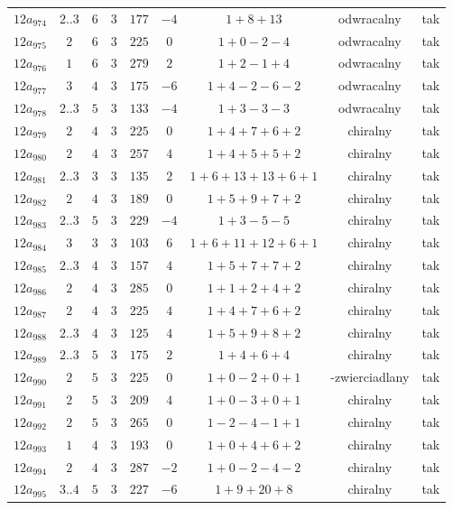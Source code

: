 \begin{longtable}{ccccccccc}
$12a_{974}$ & $2..3$ & $6$ & $3$ & $177$ & $-4$ & $1+8+13$ & odwracalny & tak \\
$12a_{975}$ & $2$ & $6$ & $3$ & $225$ & $0$ & $1+0-2-4$ & odwracalny & tak \\
$12a_{976}$ & $1$ & $6$ & $3$ & $279$ & $2$ & $1+2-1+4$ & odwracalny & tak \\
$12a_{977}$ & $3$ & $4$ & $3$ & $175$ & $-6$ & $1+4-2-6-2$ & odwracalny & tak \\
$12a_{978}$ & $2..3$ & $5$ & $3$ & $133$ & $-4$ & $1+3-3-3$ & odwracalny & tak \\
$12a_{979}$ & $2$ & $4$ & $3$ & $225$ & $0$ & $1+4+7+6+2$ & chiralny & tak \\
$12a_{980}$ & $2$ & $4$ & $3$ & $257$ & $4$ & $1+4+5+5+2$ & chiralny & tak \\
$12a_{981}$ & $2..3$ & $3$ & $3$ & $135$ & $2$ & $1+6+13+13+6+1$ & chiralny & tak \\
$12a_{982}$ & $2$ & $4$ & $3$ & $189$ & $0$ & $1+5+9+7+2$ & chiralny & tak \\
$12a_{983}$ & $2..3$ & $5$ & $3$ & $229$ & $-4$ & $1+3-5-5$ & chiralny & tak \\
$12a_{984}$ & $3$ & $3$ & $3$ & $103$ & $6$ & $1+6+11+12+6+1$ & chiralny & tak \\
$12a_{985}$ & $2..3$ & $4$ & $3$ & $157$ & $4$ & $1+5+7+7+2$ & chiralny & tak \\
$12a_{986}$ & $2$ & $4$ & $3$ & $285$ & $0$ & $1+1+2+4+2$ & chiralny & tak \\
$12a_{987}$ & $2$ & $4$ & $3$ & $225$ & $4$ & $1+4+7+6+2$ & chiralny & tak \\
$12a_{988}$ & $2..3$ & $4$ & $3$ & $125$ & $4$ & $1+5+9+8+2$ & chiralny & tak \\
$12a_{989}$ & $2..3$ & $5$ & $3$ & $175$ & $2$ & $1+4+6+4$ & chiralny & tak \\
$12a_{990}$ & $2$ & $5$ & $3$ & $225$ & $0$ & $1+0-2+0+1$ & -zwierciadlany & tak \\
$12a_{991}$ & $2$ & $5$ & $3$ & $209$ & $4$ & $1+0-3+0+1$ & chiralny & tak \\
$12a_{992}$ & $2$ & $5$ & $3$ & $265$ & $0$ & $1-2-4-1+1$ & chiralny & tak \\
$12a_{993}$ & $1$ & $4$ & $3$ & $193$ & $0$ & $1+0+4+6+2$ & chiralny & tak \\
$12a_{994}$ & $2$ & $4$ & $3$ & $287$ & $-2$ & $1+0-2-4-2$ & chiralny & tak \\
$12a_{995}$ & $3..4$ & $5$ & $3$ & $227$ & $-6$ & $1+9+20+8$ & chiralny & tak \\

\end{longtable}
